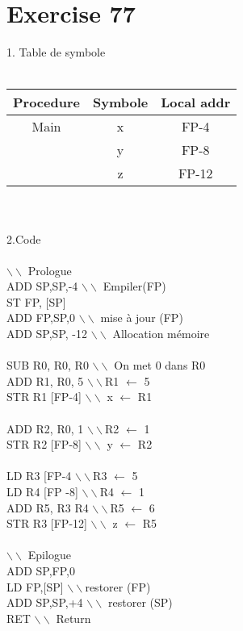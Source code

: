 \documentclass[10pt,a4paper]{article}
\begin{document}
\section{Exercise 77}
1. Table de symbole\\\\
\begin{tabular}{|c|c|c|}
\hline 
Procedure & Symbole & Local addr \\ 
\hline 
Main & x & FP-4 \\ 
\hline 
 & y & FP-8 \\ 
\hline 
 & z & FP-12 \\ 
\hline 
\end{tabular} 
\\\\
2.Code\\\\
 $\backslash\backslash$ Prologue\\
ADD SP,SP,-4        $\backslash\backslash$ Empiler(FP)\\
ST FP, [SP]\\
ADD FP,SP,0        $\backslash\backslash$ mise à jour (FP)\\
ADD SP,SP, -12        $\backslash\backslash$ Allocation mémoire\\
\\
SUB R0, R0, R0   $\backslash\backslash$ On met 0 dans R0\\
ADD R1, R0, 5  $\backslash\backslash$R1 $\leftarrow$ 5\\
STR R1 [FP-4] $\backslash\backslash$ x $\leftarrow$ R1\\
\\
ADD R2, R0, 1  $\backslash\backslash$R2 $\leftarrow$ 1\\
STR R2 [FP-8] $\backslash\backslash$ y $\leftarrow$ R2\\
\\
LD R3 [FP-4  $\backslash\backslash$R3 $\leftarrow$ 5\\
LD R4 [FP -8]  $\backslash\backslash$R4 $\leftarrow$ 1\\
ADD R5, R3 R4  $\backslash\backslash$R5 $\leftarrow$ 6\\
STR R3 [FP-12] $\backslash\backslash$ z $\leftarrow$ R5\\
\\
 $\backslash\backslash$ Epilogue\\
ADD SP,FP,0\\
LD FP,[SP] $\backslash\backslash$restorer (FP)\\
ADD SP,SP,+4 $\backslash\backslash$ restorer (SP)\\
RET  $\backslash\backslash$ Return\\
\\
\end{document}
